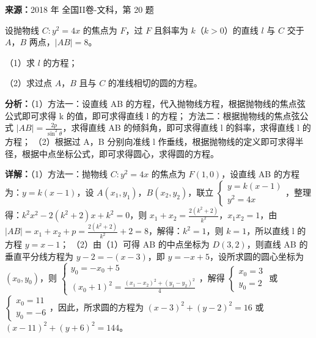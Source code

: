 \begin{question}[points=12]
\textbf{来源：}2018 年 全国II卷-文科，第 20 题\par
设抛物线 $C:y^2=4x$ 的焦点为 $F$，过 $F$ 且斜率为 $k$（$k>0$）的直线 $l$ 与 $C$ 交于 $A$，$B$ 两点，$|AB|=8$。

（1）求 $l$ 的方程；

（2）求过点 $A$，$B$ 且与 $C$ 的准线相切的圆的方程。
\begin{solution}

\textbf{分析：}（1）方法一：设直线 AB 的方程，代入抛物线方程，根据抛物线的焦点弦公式即可求得 k 的值，即可求得直线 l 的方程；
方法二：根据抛物线的焦点弦公式 $|AB|=\frac{2p}{\sin^2\theta}$，求得直线 AB 的倾斜角，即可求得直线 l 的斜率，求得直线 l 的方程；
（2）根据过 A，B 分别向准线 l 作垂线，根据抛物线的定义即可求得半径，根据中点坐标公式，即可求得圆心，求得圆的方程。

\textbf{详解：}（1）方法一：抛物线 $C:y^2=4x$ 的焦点为 $F(1,0)$，设直线 AB 的方程为：$y=k(x-1)$，设 $A(x_1,y_1)$，$B(x_2,y_2)$，联立 $\begin{cases} y=k(x-1) \\ y^2=4x \end{cases}$，整理得：$k^2x^2-2(k^2+2)x+k^2=0$，则 $x_1+x_2=\frac{2(k^2+2)}{k^2}$，$x_1x_2=1$，由 $|AB|=x_1+x_2+p=\frac{2(k^2+2)}{k^2}+2=8$，解得：$k^2=1$，则 $k=1$，所以直线 l 的方程 $y=x-1$；
（2）由（1）可得 AB 的中点坐标为 $D(3,2)$，则直线 AB 的垂直平分线方程为 $y-2=-(x-3)$，即 $y=-x+5$，设所求圆的圆心坐标为 $(x_0,y_0)$，则 $\begin{cases} y_0=-x_0+5 \\ (x_0+1)^2=\frac{(x_1-x_2)^2+(y_1-y_2)^2}{4} \end{cases}$，解得 $\begin{cases} x_0=3 \\ y_0=2 \end{cases}$ 或 $\begin{cases} x_0=11 \\ y_0=-6 \end{cases}$，因此，所求圆的方程为 $(x-3)^2+(y-2)^2=16$ 或 $(x-11)^2+(y+6)^2=144$。
\end{solution}
\end{question}

